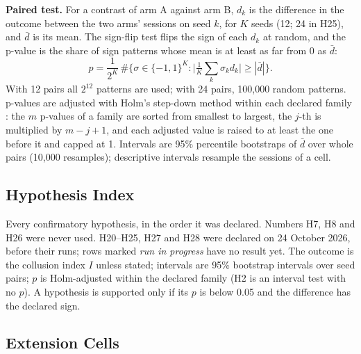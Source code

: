 \documentclass[10pt]{article}
\newcommand{\para}[1]{\textbf{#1}\hspace{0.4em}}
\begin{document}
\para{Paired test.} For a contrast of arm A against arm B, $d_k$ is the difference in the outcome between the two arms' sessions on seed $k$, for $K$ seeds (12; 24 in H25), and $\bar d$ is its mean. The sign-flip test flips the sign of each $d_k$ at random, and the p-value is the share of sign patterns whose mean is at least as far from 0 as $\bar d$:
\[
p = \frac{1}{2^K}\,\#\Big\{\sigma \in \{-1, 1\}^K : \Big|\tfrac{1}{K}\textstyle\sum_k \sigma_k d_k\Big| \ge |\bar d|\Big\}.
\]
With 12 pairs all $2^{12}$ patterns are used; with 24 pairs, 100{,}000 random patterns. p-values are adjusted with Holm's step-down method within each declared family \citep{holm1979}: the $m$ p-values of a family are sorted from smallest to largest, the $j$-th is multiplied by $m - j + 1$, and each adjusted value is raised to at least the one before it and capped at 1. Intervals are 95\% percentile bootstraps of $\bar d$ over whole pairs (10{,}000 resamples); descriptive intervals resample the sessions of a cell.

\subsection{Hypothesis Index}
\label{app:hyp}
Every confirmatory hypothesis, in the order it was declared. Numbers H7, H8 and H26 were never used. H20--H25, H27 and H28 were declared on 24 October 2026, before their runs; rows marked \emph{run in progress} have no result yet. The outcome is the collusion index $I$ unless stated; intervals are 95\% bootstrap intervals over seed pairs; $p$ is Holm-adjusted within the declared family (H2 is an interval test with no $p$). A hypothesis is supported only if its $p$ is below 0.05 and the difference has the declared sign.

\begin{table}[h]
\centering\small
\caption{Hypothesis index, from the result tables in \texttt{results/}.}
\label{tab:hyp}
\setlength{\tabcolsep}{3pt}
\end{table}

\clearpage
\subsection{Extension Cells}
\label{app:ext}
\end{document}
